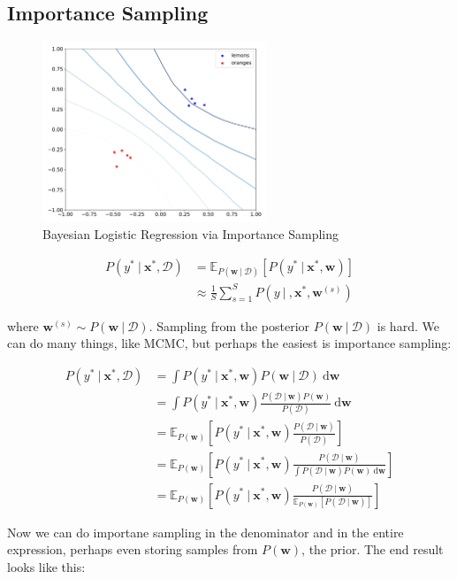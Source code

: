 \documentclass{article}
\newcommand{\vf}[1]{\mathbf{#1}}
\newcommand{\bx}{\vf{x}}
\newcommand{\bw}{\vf{w}}
\newcommand{\giv}{\ |\ }
\newcommand{\data}{\mathcal{D}}
\newcommand{\de}{\text{d}}
\begin{document}
\subsection{Importance Sampling}
\begin{figure}
    \centering
    \includegraphics[width=0.6\textwidth]{figures/bayes_logistic}
    \caption{Bayesian Logistic Regression via Importance Sampling}
    \label{fig:bayes_log_importance}
\end{figure}

\begin{align*}
    P(y^* \giv \bx^*, \data) &= \mathbb{E}_{P(\bw \giv \data)}[P(y^* \giv \bx^*, \bw)] \\
        &\approx \frac{1}{S} \sum_{s = 1}^{S} P(y \giv, \bx^*, \bw^{(s)})
\end{align*}

where $\bw^{(s)} \sim P(\bw \giv \data)$. Sampling from the posterior $P(\bw \giv \data)$ is hard. We can do many things, like MCMC, but perhaps the easiest is importance sampling:

\begin{align*}
    P(y^* \giv \bx^*, \data) &= \int P(y^* \giv \bx^*, \bw) P(\bw \giv \data)\ \de\bw \\
        &= \int P(y^* \giv \bx^*, \bw) \frac{P(\data \giv \bw) P(\bw)}{P(\data)}\  \de\bw \\
    &= \mathbb{E}_{P(\bw)} [P(y^* \giv \bx^*, \bw) \frac{P(\data \giv \bw)}{P(\data)}] \\
    &= \mathbb{E}_{P(\bw)} [P(y^* \giv \bx^*, \bw) \frac{P(\data \giv \bw)}{\int P(\data \giv \bw) P(\bw)\ \de\bw}] \\
    &= \mathbb{E}_{P(\bw)} [P(y^* \giv \bx^*, \bw) \frac{P(\data \giv \bw)}{\mathbb{E}_{P(\bw)}[P(\data \giv \bw)]}]
\end{align*}

Now we can do importane sampling in the denominator and in the entire expression, perhaps even storing samples from $P(\bw)$, the prior. The end result looks like this:
\end{document}
